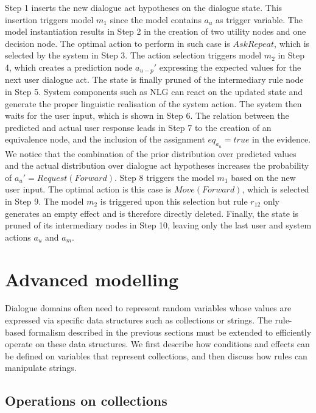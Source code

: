  
Step 1 inserts the new dialogue act hypotheses on the dialogue state.  This insertion triggers 
model $m_1$ since the model contains $a_u$ as trigger variable. The model instantiation results in Step 2 in the creation of two utility nodes and one decision node.  The optimal action to perform in such case is $\mathit{AskRepeat}$, which is selected by the system in Step 3. The action selection triggers model $m_2$ in Step 4, which creates a prediction node $a_{u-p}'$ expressing the expected values for the next user dialogue act. The state is finally pruned of the intermediary rule node in Step 5.  System components such as NLG can react on the updated state and generate the proper linguistic realisation of the system action. The system then waits for the user input, which is shown in Step 6.  The relation between the predicted and actual user response leads in Step 7 to the creation of an equivalence node, and the inclusion of the assignment $eq_{a_u} = true$ in the evidence. We notice that the combination of the prior distribution over predicted values and the actual distribution over dialogue act hypotheses increases the probability of $a_u' = \mathit{Request(Forward)}$. Step 8 triggers the model $m_1$ based on the new user input.  The optimal action is this case is $\mathit{Move(Forward)}$, which is selected in Step 9.  The model $m_2$ is triggered upon this selection but rule $r_{12}$ only generates an empty effect and is therefore directly deleted. Finally, the state is pruned of its intermediary nodes in Step 10, leaving only the last user and system actions $a_u$ and $a_m$. 


\section{Advanced modelling}
\label{sec:amodelling}

Dialogue domains often need to represent random variables whose values are expressed via specific data structures such as collections or strings. The rule-based formalism described in the previous sections must be extended to efficiently operate on these data structures.  We first describe how conditions and effects can be defined on variables that represent collections, and then discuss how rules can manipulate strings. 

\subsection{Operations on collections}

